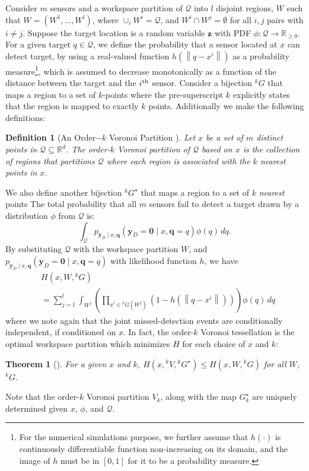 \documentclass[letterpaper, 10 pt, conference]{ieeeconf}
\newtheorem{definition}{Definition}[section]
\newtheorem{theorem}{Theorem}[section]
\newcommand{\Ram}[1]{{\normalsize{\textbf{({\color{green}Ram:\ }#1)}}}}
\newcommand{\HJ}[1]{{\color{black}{#1}}}
\begin{document}
Consider $m$ sensors and a workspace partition of $\mathcal{Q}$ into $l$ disjoint regions, $W$ such that $W = (W^1,\dots,W^l)$, where $\cup_i W^i = \mathcal{Q}$, and $W^i \cap W^j = \emptyset$ for all $i,j$ pairs with $i \neq j$. 
Suppose the target location is a random variable $\bm{z}$ with PDF $\phi:\mathcal{Q} \rightarrow \mathbb{R}_{\geq 0}$.
For a given target $q \in \mathcal{Q}$, we define the probability that a sensor located at $x$ can detect target, by using a real-valued function $h(\left\|q - x^i\right\|)$ as a probability measure\footnote{For the numerical simulations purpose, we further assume that $h(\cdot)$ is continuously differentiable function non-increasing on its domain, and the image of $h$ must be in $[0,1]$ for it to be a probability measure.}, which is assumed to decrease monotonically as a function of the distance between the target and the $i^{\textup{th}}$ sensor. 
Consider a bijection ${}^kG$ that maps a region to a set of $k$-points where the pre-superscript $k$ explicitly states that the region is mapped to exactly $k$ points.
Additionally we make the following definitions:
\begin{definition}[An Order$-k$ Voronoi Partition \cite{shamos1975closest}]
	Let $x$ be a set of $m$ distinct points in $\mathcal{Q}\subseteq \mathbb{R}^d$. 
	The \emph{order-$k$ Voronoi partition of $\mathcal{Q}$ based on $x$}\HJ{, namely ${}^kV$,} is the collection of regions that partitions $\mathcal{Q}$ where each region is associated with the $k$ nearest points in $x$.
	\label{orderk}
\end{definition}
We also define another bijection ${}^kG^{\star}$ that maps a region to a set of $k$ \emph{nearest} points \HJ{(out of $x$) to the region.} 
The total probability that all $m$ sensors fail to detect a target drawn by a distribution $\phi$ from $\mathcal{Q}$ is:
\begin{equation}
\int_{\mathcal{Q}} p_{\bm{y}_{D} \mid x,\bm{q}
}\left(\bm{y}_D = \mathbf{0} \mid x,\bm{q}=q
\right)\phi(q)\,{dq}.
\end{equation}
By substituting $\mathcal{Q}$ with the workspace partition $W$, and 
$p_{\bm{y}_{D} \mid x,\bm{q}
}\left(\bm{y}_D = \mathbf{0} \mid x,\bm{q}=q
\right)$
 with likelihood function $h$, we have
\begin{align}
&H(x,W,{}^kG) \nonumber \\
&= \sum_{j = 1}^l \int_{W^j} \left( \prod_{x^i \in {}^kG(W^j)} \left(1- h \left(\left\|
q - x^i \right\|  \right) \right) \right)\phi(q)\,dq
\label{cost2}
\end{align}
where we note again that the joint missed-detection events are conditionally independent, if conditioned on $x$.
In fact, the order-$k$ Voronoi tessellation is the optimal workspace partition which minimizes $H$ for each choice of $x$ and $k$:
\begin{theorem}[\cite{park2014robust}]
	For a given $x$ and $k$,
	$
	H(x,{}^{k}V,{}^kG^{\star}) \leq H(x,W,{}^{k}G)
	$
	for all $W$, ${}^{k}G$.
\end{theorem}
\noindent Note that the order-$k$ Voronoi partition $V_k$, along with the map $G_k^{\star}$ are uniquely determined given $x$, $\phi$, and $\mathcal{Q}$. 
\end{document}
